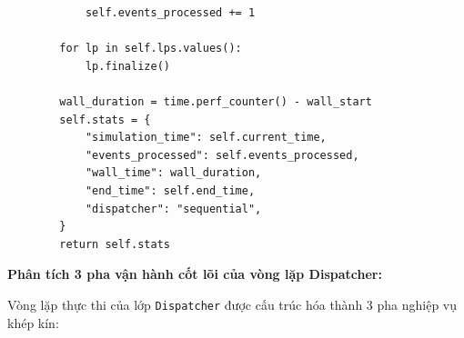 \begin{lstlisting}
            self.events_processed += 1

        for lp in self.lps.values():
            lp.finalize()

        wall_duration = time.perf_counter() - wall_start
        self.stats = {
            "simulation_time": self.current_time,
            "events_processed": self.events_processed,
            "wall_time": wall_duration,
            "end_time": self.end_time,
            "dispatcher": "sequential",
        }
        return self.stats
\end{lstlisting}

\textbf{Phân tích 3 pha vận hành cốt lõi của vòng lặp Dispatcher:}

Vòng lặp thực thi của lớp \texttt{Dispatcher} được cấu trúc hóa thành 3 pha nghiệp vụ khép kín:

